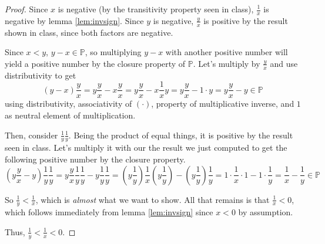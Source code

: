 \documentclass[letterpaper,11pt]{article}
\renewcommand{\P}{\mathbb{P}}
\begin{document}
\begin{proof}
    Since $x$ is negative (by the transitivity property seen in class),
    $\frac{1}{x}$ is negative by lemma \ref{lem:invsign}. Since $y$ is
    negative, $\frac{y}{x}$ is positive by the result shown in class, since
    both factors are negative.

    Since $x < y$, $y - x \in \P$, so multiplying $y - x$ with another positive
    number will yield a positive number by the closure property of $\P$. Let's
    multiply by $\frac{y}{x}$ and use distributivity to get
    \begin{equation*}
        (y - x)\frac{y}{x}
        = y \frac{y}{x} - x \frac{y}{x}
        = y \frac{y}{x} - x \frac{1}{x} y
        = y \frac{y}{x} - 1 \cdot y
        = y \frac{y}{x} - y \in \P
    \end{equation*}
    using distributivity, associativity of $(\cdot)$, property of
    multiplicative inverse, and $1$ as neutral element of multiplication.

    Then, consider $\frac{1}{y}\frac{1}{y}$. Being the product of equal things,
    it is positive by the result seen in class. Let's multiply it with our
    the result we just computed to get the following positive number by the
    closure property.
    \begin{equation*}
        \left(y \frac{y}{x} - y\right)\frac{1}{y}\frac{1}{y}
        = y \frac{y}{x}\frac{1}{y}\frac{1}{y} - y\frac{1}{y}\frac{1}{y}
        = \left(y \frac{1}{y}\right) \frac{1}{x} \left(y \frac{1}{y}\right)
        - \left(y\frac{1}{y}\right)\frac{1}{y}
        = 1 \cdot \frac{1}{x} \cdot 1 - 1 \cdot \frac{1}{y}
        = \frac{1}{x} - \frac{1}{y} \in \P
    \end{equation*}

    So $\frac{1}{y} < \frac{1}{x}$, which is \emph{almost} what we want to
    show. All that remains is that $\frac{1}{x} < 0$, which follows immediately
    from lemma \ref{lem:invsign} since $x < 0$ by assumption.

    Thus, $\frac{1}{y} < \frac{1}{x} < 0$.
\end{proof}
\end{document}
